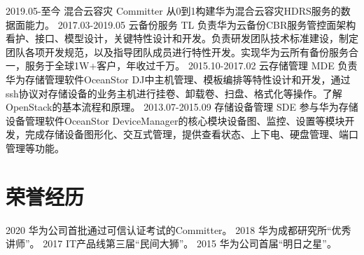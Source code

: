 \documentclass[]{resume}
\begin{document}
\begin{twenty}
  \twentyitem
    {2019.05-至今}
    {混合云容灾}
    {Committer}
    {从0到1构建华为混合云容灾HDRS服务的数据面能力。}
  \twentyitem
    {2017.03-2019.05}
    {云备份服务}
    {TL}
    {负责华为云备份CBR服务管控面架构看护、接口、模型设计，关键特性设计和开发。负责研发团队技术标准建设，制定团队各项开发规范，以及指导团队成员进行特性开发。实现华为云所有备份服务合一，服务于全球1W+客户，年收过千万。}
\twentyitem
    {2015.10-2017.02}
    {云存储管理}
    {MDE}
    {负责华为存储管理软件OceanStor DJ中主机管理、模板编排等特性设计和开发，通过ssh协议对存储设备的业务主机进行挂卷、卸载卷、扫盘、格式化等操作。了解OpenStack的基本流程和原理。}
\twentyitem
    {2013.07-2015.09}
    {存储设备管理}
    {SDE}
    {参与华为存储设备管理软件OceanStor DeviceManager的核心模块设备图、监控、设置等模块开发，完成存储设备图形化、交互式管理，提供查看状态、上下电、硬盘管理、端口管理等功能。}
\end{twenty}

\section{荣誉经历}

\begin{twentyshort}
  \twentyitemshort
    {2020}
    {华为公司首批通过可信认证考试的Committer。}
  \twentyitemshort
    {2018}
    {华为成都研究所“优秀讲师”。}
  \twentyitemshort
    {2017}
    {IT产品线第三届“民间大狮”。}
  \twentyitemshort
    {2015}
    {华为公司首届“明日之星”。}
\end{twentyshort}

\end{document}
